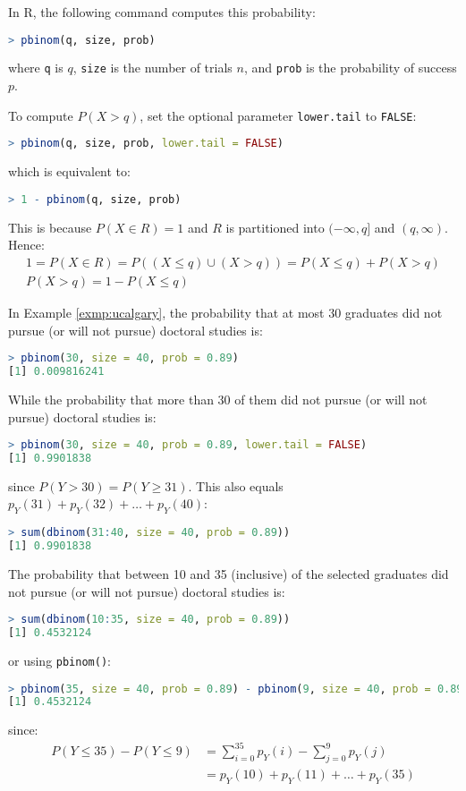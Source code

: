 In R, the following command computes this probability:
\begin{lstlisting}[language=R]
> pbinom(q, size, prob)
\end{lstlisting}
where \verb|q| is \( q \), \verb|size| is the number of trials \( n \), and \verb|prob| is the probability of success \( p \).

To compute \( P(X > q) \), set the optional parameter \verb|lower.tail| to \verb|FALSE|:
\begin{lstlisting}[language=R]
> pbinom(q, size, prob, lower.tail = FALSE)
\end{lstlisting}
which is equivalent to:
\begin{lstlisting}[language=R]
> 1 - pbinom(q, size, prob)
\end{lstlisting}
This is because \( P(X \in R) = 1 \) and \( R \) is partitioned into \( (-\infty, q] \) and \( (q, \infty) \).
Hence:
\begin{gather*}
    1 = P(X \in R) = P((X \leq q) \cup (X > q)) = P(X \leq q) + P(X > q)\\
    P(X > q) = 1 - P(X \leq q)
\end{gather*}
\begin{exmp}
    In Example \autoref{exmp:ucalgary}, the probability that at most 30 graduates did not pursue (or will not pursue) doctoral studies is:
    \begin{lstlisting}[language=R]
> pbinom(30, size = 40, prob = 0.89)
[1] 0.009816241
    \end{lstlisting}
    While the probability that more than 30 of them did not pursue (or will not pursue) doctoral studies is:
    \begin{lstlisting}[language=R]
> pbinom(30, size = 40, prob = 0.89, lower.tail = FALSE)
[1] 0.9901838
    \end{lstlisting}
    since \( P(Y > 30) = P(Y \geq 31) \).
    This also equals \( p_{Y}(31) + p_{Y}(32) + \ldots + p_{Y}(40) \):
    \begin{lstlisting}[language=R]
> sum(dbinom(31:40, size = 40, prob = 0.89))
[1] 0.9901838
    \end{lstlisting}
    The probability that between 10 and 35 (inclusive) of the selected graduates did not pursue (or will not pursue) doctoral studies is:
    \begin{lstlisting}[language=R]
> sum(dbinom(10:35, size = 40, prob = 0.89))
[1] 0.4532124
    \end{lstlisting}
    or using \verb|pbinom()|:
    \begin{lstlisting}[language=R]
> pbinom(35, size = 40, prob = 0.89) - pbinom(9, size = 40, prob = 0.89)
[1] 0.4532124
    \end{lstlisting}
    since:
    \begin{align*}
        P(Y \leq 35) - P(Y \leq 9) &= \sum_{i = 0}^{35} p_{Y}(i) - \sum_{j = 0}^{9} p_{Y}(j)\\
        &= p_{Y}(10) + p_{Y}(11) + \ldots + p_{Y}(35)
    \end{align*}
\end{exmp}

